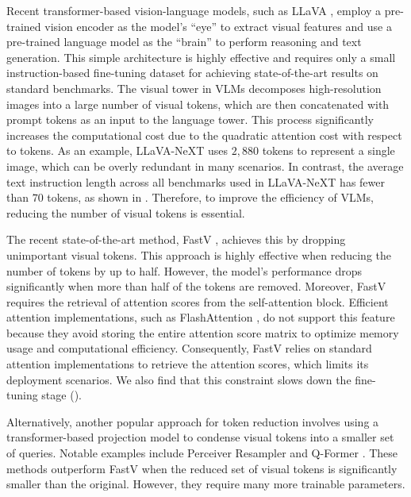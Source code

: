 \documentclass{article} %
\begin{document}
Recent transformer-based vision-language models, such as LLaVA \citep{liu2024visual}, employ a pre-trained vision encoder as the model's ``eye'' to extract visual features and use a pre-trained language model as the ``brain'' to perform reasoning and text generation. This simple architecture is highly effective and requires only a small instruction-based fine-tuning dataset for achieving state-of-the-art results on standard benchmarks. The visual tower in VLMs decomposes high-resolution images into a large number of visual tokens, which are then concatenated with prompt tokens as an input to the language tower. This process significantly increases the computational cost due to the quadratic attention cost with respect to tokens. As an example, LLaVA-NeXT \citep{liu2024llavanext} uses $2,880$ tokens to represent a single image, which can be overly redundant in many scenarios. In contrast, the average text instruction length across all benchmarks used in LLaVA-NeXT has fewer than $70$ tokens, as shown in . Therefore, to improve the efficiency of VLMs, reducing the number of visual tokens is essential. 

The recent state-of-the-art method, FastV \citep{chen2024image}, achieves this by dropping unimportant visual tokens. This approach is highly effective when reducing the number of tokens by up to half. However, the model's performance drops significantly when more than half of the tokens are removed. Moreover, FastV requires the retrieval of attention scores from the self-attention block. Efficient attention implementations, such as FlashAttention \citep{dao2022flashattention, dao2023flashattention}, do not support this feature because they avoid storing the entire attention score matrix to optimize memory usage and computational efficiency. Consequently, FastV relies on standard attention implementations to retrieve the attention scores, which limits its deployment scenarios. We also find that this constraint slows down the fine-tuning stage (). 

Alternatively, another popular approach for token reduction involves using a transformer-based projection model to condense visual tokens into a smaller set of queries. Notable examples include Perceiver Resampler \citep{jaegle2021perceiver, alayrac2022flamingo, bai2023qwen} and Q-Former \citep{li2023blip}. These methods outperform FastV when the reduced set of visual tokens is significantly smaller than the original. However, they require many more trainable parameters.
\end{document}
